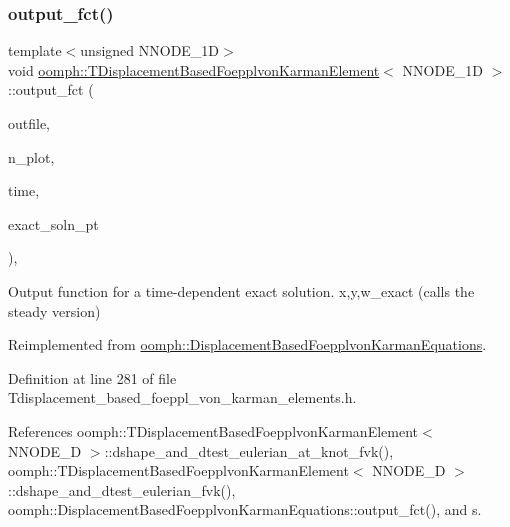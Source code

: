 \subsubsection{\texorpdfstring{output\+\_\+fct()}{output\_fct()}\hspace{0.1cm}{\footnotesize\ttfamily [2/2]}}
{\footnotesize\ttfamily template$<$unsigned N\+N\+O\+D\+E\+\_\+1D$>$ \\
void \hyperlink{classoomph_1_1TDisplacementBasedFoepplvonKarmanElement}{oomph\+::\+T\+Displacement\+Based\+Foepplvon\+Karman\+Element}$<$ N\+N\+O\+D\+E\+\_\+1D $>$\+::output\+\_\+fct (\begin{DoxyParamCaption}\item[{std\+::ostream \&}]{outfile,  }\item[{const unsigned \&}]{n\+\_\+plot,  }\item[{const double \&}]{time,  }\item[{\hyperlink{classoomph_1_1FiniteElement_ad4ecf2b61b158a4b4d351a60d23c633e}{Finite\+Element\+::\+Unsteady\+Exact\+Solution\+Fct\+Pt}}]{exact\+\_\+soln\+\_\+pt }\end{DoxyParamCaption})\hspace{0.3cm}{\ttfamily [inline]}, {\ttfamily [virtual]}}



Output function for a time-\/dependent exact solution. x,y,w\+\_\+exact (calls the steady version) 



Reimplemented from \hyperlink{classoomph_1_1DisplacementBasedFoepplvonKarmanEquations_a55cc825e8aedbc958617b03dea2afe29}{oomph\+::\+Displacement\+Based\+Foepplvon\+Karman\+Equations}.



Definition at line 281 of file Tdisplacement\+\_\+based\+\_\+foeppl\+\_\+von\+\_\+karman\+\_\+elements.\+h.



References oomph\+::\+T\+Displacement\+Based\+Foepplvon\+Karman\+Element$<$ N\+N\+O\+D\+E\+\_\+D $>$\+::dshape\+\_\+and\+\_\+dtest\+\_\+eulerian\+\_\+at\+\_\+knot\+\_\+fvk(), oomph\+::\+T\+Displacement\+Based\+Foepplvon\+Karman\+Element$<$ N\+N\+O\+D\+E\+\_\+D $>$\+::dshape\+\_\+and\+\_\+dtest\+\_\+eulerian\+\_\+fvk(), oomph\+::\+Displacement\+Based\+Foepplvon\+Karman\+Equations\+::output\+\_\+fct(), and s.

\mbox{\label{classoomph_1_1TDisplacementBasedFoepplvonKarmanElement_a85ccfc34138dd1d839ad18eb17ca0e4c}} 
